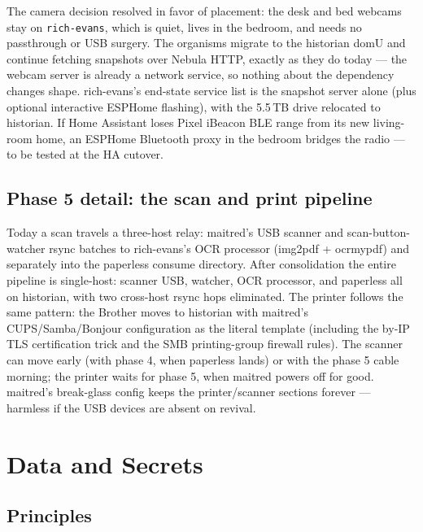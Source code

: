 \documentclass[11pt,letterpaper,headings=small]{scrartcl}
\begin{document}
The camera decision resolved in favor of placement: the desk and bed
webcams stay on \texttt{rich-evans}, which is quiet, lives in the
bedroom, and needs no passthrough or USB surgery. The organisms migrate
to the historian domU and continue fetching snapshots over Nebula HTTP,
exactly as they do today --- the webcam server is already a network
service, so nothing about the dependency changes shape. rich-evans's
end-state service list is the snapshot server alone (plus optional
interactive ESPHome flashing), with the 5.5\,TB drive relocated to
historian. If Home Assistant loses Pixel iBeacon BLE range from its new
living-room home, an ESPHome Bluetooth proxy in the bedroom bridges the
radio --- to be tested at the HA cutover.

\subsection{Phase 5 detail: the scan and print pipeline}

Today a scan travels a three-host relay: maitred's USB scanner and
scan-button-watcher rsync batches to rich-evans's OCR processor
(img2pdf + ocrmypdf) and separately into the paperless consume
directory. After consolidation the entire pipeline is single-host:
scanner USB, watcher, OCR processor, and paperless all on historian,
with two cross-host rsync hops eliminated. The printer follows the same
pattern: the Brother moves to historian with maitred's CUPS/Samba/Bonjour
configuration as the literal template (including the by-IP TLS
certification trick and the SMB printing-group firewall rules). The
scanner can move early (with phase 4, when paperless lands) or with the
phase 5 cable morning; the printer waits for phase 5, when maitred powers
off for good. maitred's break-glass config keeps the printer/scanner
sections forever --- harmless if the USB devices are absent on revival.

\section{Data and Secrets}

\subsection{Principles}
\end{document}
